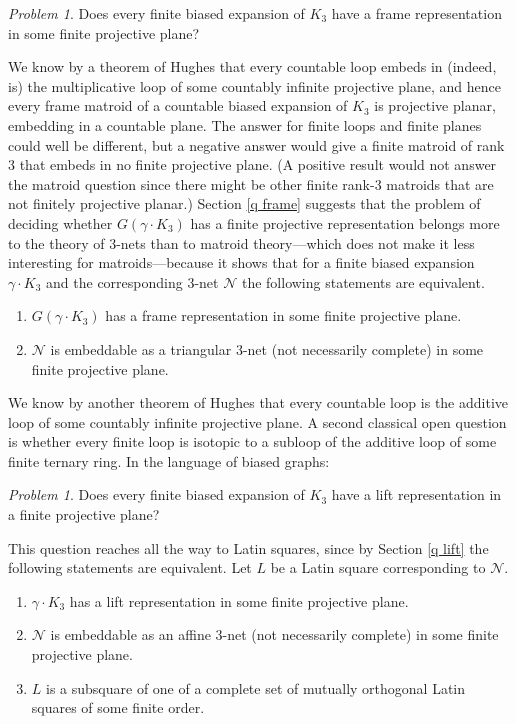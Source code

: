 \documentclass[reqno,12pt]{amsart}
\theoremstyle{remark}
\newtheorem{prob}[thm]{Problem}
\numberwithin{equation}{section}
\numberwithin{figure}{section}
\newcommand \cN{\mathcal{N}}
\begin{document}
\begin{prob}	\label{PrD:planerepb}
Does every finite biased expansion of $K_3$ have a frame representation in some finite projective plane?
\end{prob}

We know by a theorem of Hughes \cite{HughesAML} that every countable loop embeds in (indeed, is) the multiplicative loop of some countably infinite projective plane, and hence every frame matroid of a countable biased expansion of $K_3$ is projective planar, embedding in a countable plane.    
The answer for finite loops and finite planes could well be different, but a negative answer would give a finite matroid of rank 3 that embeds in no finite projective plane.  (A positive result would not answer the matroid question since there might be other finite rank-3 matroids that are not finitely projective planar.)  
Section \ref{q frame} suggests that the problem of deciding whether $G(\gamma\cdot K_3)$ has a finite projective representation belongs more to the theory of $3$-nets than to matroid theory---which does not make it less interesting for matroids---because it shows that for a finite biased expansion $\gamma\cdot K_3$ and the corresponding 3-net $\cN$ the following statements are equivalent.  
\begin{enumerate}[{\rm(i)}]
\item  $G(\gamma\cdot K_3)$ has a frame representation in some finite projective plane.
\item  $\cN$ is embeddable as a triangular $3$-net (not necessarily complete) in some finite projective plane.
\end{enumerate}

We know by another theorem of Hughes \cite{HughesAML} that every countable loop is the additive loop of some countably infinite projective plane.  A second classical open question is whether every finite loop is isotopic to a subloop of the additive loop of some finite ternary ring.   
In the language of biased graphs: 

\begin{prob}	\label{PrD:planerepl}
Does every finite biased expansion of $K_3$ have a lift representation in a finite projective plane?
\end{prob}

This question reaches all the way to Latin squares, since by Section \ref{q lift} the following statements are equivalent.  Let $L$ be a Latin square corresponding to $\cN$.  
\begin{enumerate}[{\rm(i)}]
\item  $\gamma\cdot K_3$ has a lift representation in some finite projective plane.
\item  $\cN$ is embeddable as an affine $3$-net (not necessarily complete) in some finite projective plane.
\item  $L$ is a subsquare of one of a complete set of mutually orthogonal Latin squares of some finite order.
\end{enumerate}
\end{document}
